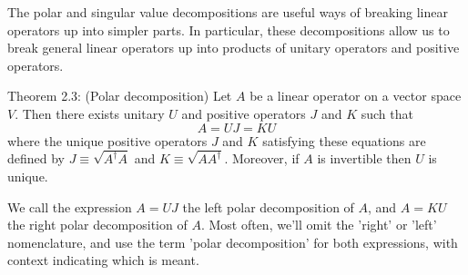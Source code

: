 The polar and singular value decompositions are useful ways of breaking linear operators up into simpler parts. In particular, these decompositions allow us to break general linear operators up into products of unitary operators and positive operators. 


\begin{theorem}
Theorem 2.3: (Polar decomposition) Let $A$ be a linear operator on a vector space $V$. Then there exists unitary $U$ and positive operators $J$ and $K$ such that
\begin{equation}
    A=U J=K U
\end{equation}
where the unique positive operators $J$ and $K$ satisfying these equations are defined by $J \equiv \sqrt{A^{\dagger} A}$ and $K \equiv \sqrt{A A^{\dagger}}$. Moreover, if $A$ is invertible then $U$ is unique.
\end{theorem}

We call the expression $A=U J$ the left polar decomposition of $A$, and $A=K U$ the right polar decomposition of $A$. Most often, we'll omit the 'right' or 'left' nomenclature, and use the term 'polar decomposition' for both expressions, with context indicating which is meant.

